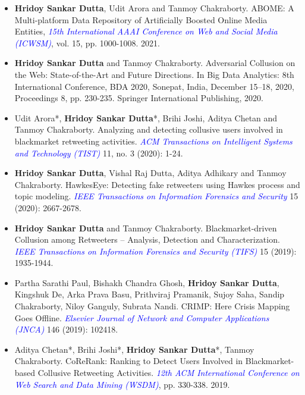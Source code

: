 \documentclass[margin, centered,lmodern]{res}
\begin{document}
\begin{resume}
\begin{itemize}[leftmargin=*]
\item \textbf{Hridoy Sankar Dutta}, Udit Arora and Tanmoy Chakraborty. ABOME: A Multi-platform Data Repository of Artificially Boosted Online Media Entities, \textit{\textcolor{blue}{15th International AAAI Conference on Web and Social Media (ICWSM)}}, vol. 15, pp. 1000-1008. 2021.

\item \textbf{Hridoy Sankar Dutta} and Tanmoy Chakraborty. Adversarial Collusion on the Web: State-of-the-Art and Future Directions. In Big Data Analytics: 8th International Conference, BDA 2020, Sonepat, India, December 15–18, 2020, Proceedings 8, pp. 230-235. Springer International Publishing, 2020.

\item Udit Arora*,  \textbf{Hridoy Sankar Dutta}*,  Brihi Joshi,  Aditya Chetan and Tanmoy Chakraborty.  Analyzing and detecting collusive users involved in blackmarket retweeting activities. \textit{\textcolor{blue}{ACM Transactions on Intelligent Systems and Technology (TIST)}} 11, no. 3 (2020): 1-24.

\item \textbf{Hridoy Sankar Dutta},  Vishal Raj Dutta,  Aditya Adhikary and Tanmoy Chakraborty. HawkesEye: Detecting fake retweeters using Hawkes process and topic modeling. \textit{\textcolor{blue}{IEEE Transactions on Information Forensics and Security}} 15 (2020): 2667-2678.

\item \textbf{Hridoy Sankar Dutta} and Tanmoy Chakraborty. Blackmarket-driven Collusion among Retweeters – Analysis, Detection and Characterization. \textit{\textcolor{blue}{IEEE Transactions on Information Forensics and Security (TIFS)}} 15 (2019): 1935-1944.

\item Partha Sarathi Paul, Bishakh Chandra Ghosh, \textbf{Hridoy Sankar Dutta}, Kingshuk De, Arka Prava Basu, Prithviraj Pramanik, Sujoy Saha, Sandip Chakraborty, Niloy Ganguly, Subrata Nandi. CRIMP: Here Crisis Mapping Goes Offline. \textit{\textcolor{blue}{Elsevier Journal of Network and Computer Applications (JNCA)}} 146 (2019): 102418.

\item  Aditya Chetan*, Brihi Joshi*, \textbf{Hridoy Sankar Dutta}*, Tanmoy Chakraborty. CoReRank: Ranking to Detect Users Involved in Blackmarket-based Collusive Retweeting Activities. \textit{\textcolor{blue}{12th ACM International Conference on Web Search and Data Mining (WSDM)}}, pp. 330-338. 2019.



\end{itemize}
\end{resume}
\end{document}

